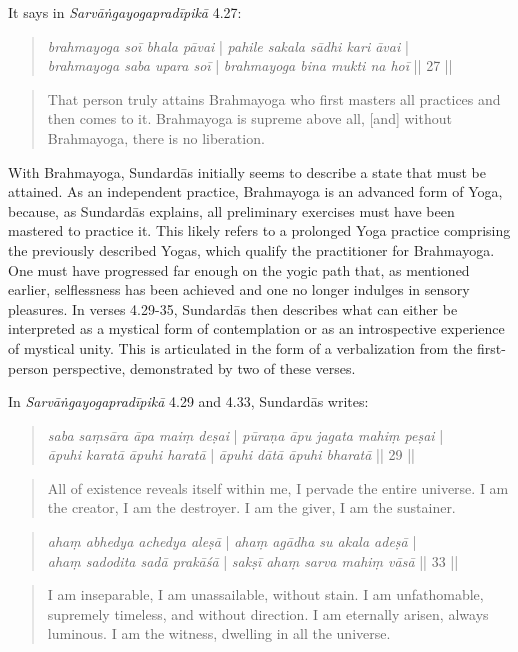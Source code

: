 It says in \textit{Sarvāṅgayogapradīpikā} 4.27:
\begin{quote}
\textit{brahmayoga soī bhala pāvai} | \textit{pahile sakala sādhi kari āvai} |\\
\textit{brahmayoga saba upara soī} | \textit{brahmayoga bina mukti na hoī} || 27 ||
\end{quote}
\begin{quote}
That person truly attains Brahmayoga who first masters all practices and then comes to it.  
Brahmayoga is supreme above all, [and] without Brahmayoga, there is no liberation.
\end{quote}

With Brahmayoga, Sundardās initially seems to describe a state that must be attained. As an independent practice, Brahmayoga is an advanced form of Yoga, because, as Sundardās explains, all preliminary exercises must have been mastered to practice it. This likely refers to a prolonged Yoga practice comprising the previously described Yogas, which qualify the practitioner for Brahmayoga. One must have progressed far enough on the yogic path that, as mentioned earlier, selflessness has been achieved and one no longer indulges in sensory pleasures. In verses 4.29-35, Sundardās then describes what can either be interpreted as a mystical form of contemplation or as an introspective experience of mystical unity. This is articulated in the form of a verbalization from the first-person perspective, demonstrated by two of these verses.

In \textit{Sarvāṅgayogapradīpikā} 4.29 and 4.33, Sundardās writes:
\begin{quote}
\textit{saba saṃsāra āpa maiṃ deṣai} | \textit{pūraṇa āpu jagata mahiṃ peṣai} |\\
\textit{āpuhi karatā āpuhi haratā} | \textit{āpuhi dātā āpuhi bharatā} || 29 || 
\end{quote}
\begin{quote}
  All of existence reveals itself within me, I pervade the entire universe. 
  I am the creator, I am the destroyer. I am the giver, I am the sustainer.
\end{quote}
\begin{quote}
\textit{ahaṃ abhedya achedya aleṣā} | \textit{ahaṃ agādha su akala adeṣā} | \\
\textit{ahaṃ sadodita sadā prakāśā} | \textit{sakṣī ahaṃ sarva mahiṃ vāsā} || 33 ||
\end{quote}
\begin{quote}
  I am inseparable, I am unassailable, without stain. I am unfathomable, supremely timeless, and without direction.
  I am eternally arisen, always luminous. I am the witness, dwelling in all the universe.
\end{quote}

